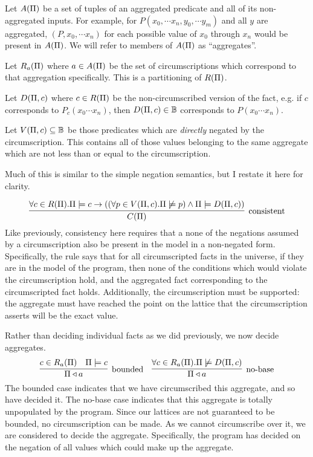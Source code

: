 Let $A(\Pi)$ be a set of tuples of an aggregated predicate and all of its non-aggregated inputs.
For example, for $P(x_0, \cdots x_n, y_0, \cdots y_m)$ and all $y$ are aggregated, $(P, x_0, \cdots x_n)$ for each possible value of $x_0$ through $x_n$ would be present in $A(\Pi)$.
We will refer to members of $A(\Pi)$ as ``aggregates''.

Let $R_a(\Pi)$ where $a \in A(\Pi)$ be the set of circumscriptions which correspond to that aggregation specifically.
This is a partitioning of $R(\Pi)$.

Let $D(\Pi, c)$ where $c \in R(\Pi)$ be the non-circumscribed version of the fact, e.g. if $c$ corresponds to $P_c(x_0 \cdots x_n)$, then $D(\Pi, c) \in \mathbb{B}$ corresponds to $P(x_0 \cdots x_n)$.

Let $V(\Pi, c) \subseteq \mathbb{B}$ be those predicates which are \emph{directly} negated by the circumscription.
This contains all of those values belonging to the same aggregate which are not less than or equal to the circumscription.


Much of this is similar to the simple negation semantics, but I restate it here for clarity.

\[
	\infer[\textrm{consistent}]{\cons{\Pi}}{\forall c \in \circset(\Pi). \Pi \models c \imp ((\forall p \in \viol{\Pi}{c}. \Pi \not \models p) \wedge \Pi \models \decirc{\Pi}{c})}
\]
Like previously, consistency here requires that a none of the negations assumed by a circumscription also be present in the model in a non-negated form.
Specifically, the rule says that for all circumscripted facts in the universe, if they are in the model of the program, then none of the conditions which would violate the circumscription hold, and the aggregated fact corresponding to the circumscripted fact holds.
Additionally, the circumscription must be supported: the aggregate must have reached the point on the lattice that the circumscription asserts will be the exact value.

Rather than deciding individual facts as we did previously, we now decide aggregates.
\[
	\infer[\textrm{bounded}]{\Pi \decides a}{c \in \circset_a(\Pi) & \Pi \models c}
	\quad
	\infer[\textrm{no-base}]{\Pi \decides a}{\forall c \in \circset_a(\Pi). \Pi \not \models \decirc{\Pi}{c}}
\]
The bounded case indicates that we have circumscribed this aggregate, and so have decided it.
The no-base case indicates that this aggregate is totally unpopulated by the program.
Since our lattices are not guaranteed to be bounded, no circumscription can be made.
As we cannot circumscribe over it, we are considered to decide the aggregate.
Specifically, the program has decided on the negation of all values which could make up the aggregate.

